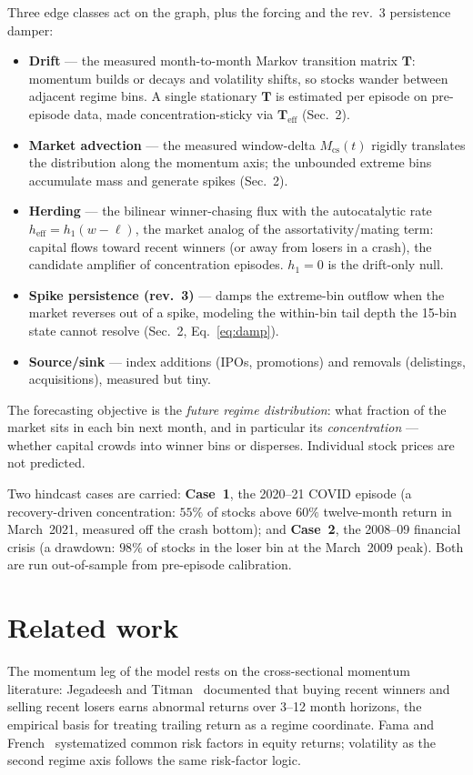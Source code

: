 \documentclass[11pt,a4paper]{article}
\begin{document}
Three edge classes act on the graph, plus the forcing and the rev.~3
persistence damper:
\begin{itemize}
  \item \textbf{Drift} --- the measured month-to-month Markov transition
    matrix $\mathbf{T}$: momentum builds or decays and volatility shifts, so
    stocks wander between adjacent regime bins.  A single stationary
    $\mathbf{T}$ is estimated per episode on pre-episode data, made
    concentration-sticky via $\mathbf{T}_{\mathrm{eff}}$ (Sec.~2).
  \item \textbf{Market advection} --- the measured window-delta
    $M_{\mathrm{cs}}(t)$ rigidly translates the distribution along the
    momentum axis; the unbounded extreme bins accumulate mass and generate
    spikes (Sec.~2).
  \item \textbf{Herding} --- the bilinear winner-chasing flux with the
    autocatalytic rate $h_{\mathrm{eff}}=h_1(w-\ell)$, the market analog of
    the assortativity/mating term: capital flows toward recent winners (or
    away from losers in a crash), the candidate amplifier of concentration
    episodes.  $h_1=0$ is the drift-only null.
  \item \textbf{Spike persistence (rev.~3)} --- damps the extreme-bin outflow
    when the market reverses out of a spike, modeling the within-bin tail
    depth the 15-bin state cannot resolve (Sec.~2, Eq.~\eqref{eq:damp}).
  \item \textbf{Source/sink} --- index additions (IPOs, promotions) and
    removals (delistings, acquisitions), measured but tiny.
\end{itemize}
The forecasting objective is the \emph{future regime distribution}: what
fraction of the market sits in each bin next month, and in particular its
\emph{concentration} --- whether capital crowds into winner bins or disperses.
Individual stock prices are not predicted.

Two hindcast cases are carried: \textbf{Case~1}, the 2020--21 COVID episode
(a recovery-driven concentration: $55\%$ of stocks above $60\%$ twelve-month
return in March~2021, measured off the crash bottom); and \textbf{Case~2},
the 2008--09 financial crisis (a drawdown: $98\%$ of stocks in the loser bin
at the March~2009 peak).  Both are run out-of-sample from pre-episode calibration.

\section{Related work}
The momentum leg of the model rests on the cross-sectional momentum
literature: Jegadeesh and Titman~\cite{jegadeesh1993} documented that buying
recent winners and selling recent losers earns abnormal returns over 3--12
month horizons, the empirical basis for treating trailing return as a regime
coordinate.  Fama and French~\cite{fama1993} systematized common risk factors
in equity returns; volatility as the second regime axis follows the same
risk-factor logic.
\end{document}
